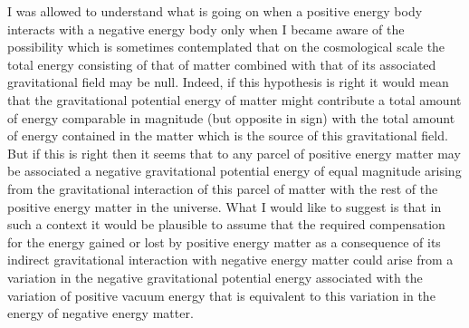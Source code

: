 \documentclass[notitlepage,12pt]{report}
\begin{document}
I was allowed to understand what is going on when a positive energy body interacts with a negative energy body only when I became aware of the possibility which is sometimes contemplated that on the cosmological scale the total energy consisting of that of matter combined with that of its associated gravitational field may be null. Indeed, if this hypothesis is right it would mean that the gravitational potential energy of matter might contribute a total amount of energy comparable in magnitude (but opposite in sign) with the total amount of energy contained in the matter which is the source of this gravitational field. But if this is right then it seems that to any parcel of positive energy matter may be associated a negative gravitational potential energy of equal magnitude arising from the gravitational interaction of this parcel of matter with the rest of the positive energy matter in the universe. What I would like to suggest is that in such a context it would be plausible to assume that the required compensation for the energy gained or lost by positive energy matter as a consequence of its indirect gravitational interaction with negative energy matter could arise from a variation in the negative gravitational potential energy associated with the variation of positive vacuum energy that is equivalent to this variation in the energy of negative energy matter.
\end{document}

